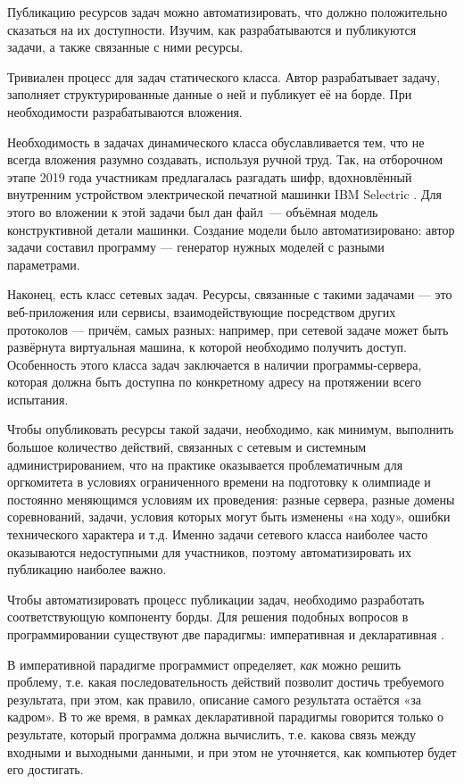 Публикацию ресурсов задач можно автоматизировать, что должно положительно сказаться на их доступности. Изучим, как разрабатываются и публикуются задачи, а также связанные с ними ресурсы.

\FloatBarrier

Тривиален процесс для задач статического класса. Автор разрабатывает задачу, заполняет структурированные данные о ней и публикует её на борде. При необходимости разрабатываются вложения.

Необходимость в задачах динамического класса обуславливается тем, что не всегда вложения разумно создавать, используя ручной труд. Так, на отборочном этапе 2019 года участникам предлагалась разгадать шифр, вдохновлённый внутренним устройством электрической печатной машинки IBM Selectric \cite{Selectric}. Для этого во вложении к этой задачи был дан файл~--- объёмная модель конструктивной детали машинки. Создание модели было автоматизировано: автор задачи составил программу — генератор нужных моделей с разными параметрами.


Наконец, есть класс сетевых задач. Ресурсы, связанные с такими задачами — это веб-приложения или сервисы, взаимодействующие посредством других протоколов — причём, самых разных: например, при сетевой задаче может быть развёрнута виртуальная машина, к которой необходимо получить доступ. Особенность этого класса задач заключается в наличии программы-сервера, которая должна быть доступна по конкретному адресу на протяжении всего испытания.

Чтобы опубликовать ресурсы такой задачи, необходимо, как минимум, выполнить большое количество действий, связанных с сетевым и системным администрированием, что на практике оказывается проблематичным для оргкомитета в условиях ограниченного времени на подготовку к олимпиаде и постоянно меняющимся условиям их проведения: разные сервера, разные домены соревнований, задачи, условия которых могут быть изменены «на ходу», ошибки технического характера и т.д. Именно задачи сетевого класса наиболее часто оказываются недоступными для участников, поэтому автоматизировать их публикацию наиболее важно.

Чтобы автоматизировать процесс публикации задач, необходимо разработать соответствующую компоненту борды. Для решения подобных вопросов в программировании существуют две парадигмы: императивная и декларативная \cite{Cioni88}.

В императивной парадигме программист определяет, \textit{как} можно решить проблему, т.е. какая последовательность действий позволит достичь требуемого результата, при этом, как правило, описание самого результата остаётся «за кадром». В то же время, в рамках декларативной парадигмы говорится только о результате, который программа должна вычислить, т.е. какова связь между входными и выходными данными, и при этом не уточняется, как компьютер будет его достигать.

